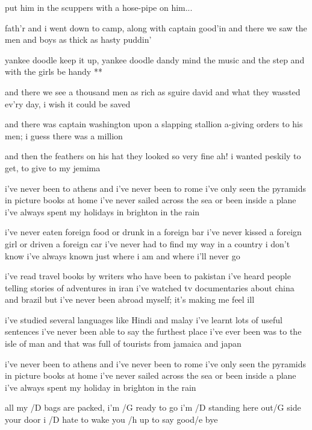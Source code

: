 put him in the scuppers with a hose-pipe on him...




fath'r and i went down to camp, along with captain good'in
and there we saw the men and boys as thick as hasty puddin'

\R  yankee doodle keep it up, yankee doodle dandy
    mind the music and the step and with the girls be handy **

and there we see a thousand men as rich as sguire david
and what they wassted ev'ry day, i wish it could be saved \s

and there was captain washington upon a slapping stallion
a-giving orders to his men; i guess there was a million \s

and then the feathers on his hat they looked so very fine
ah! i wanted peskily to get, to give to my jemima




i've never been to athens and i've never been to rome
i've only seen the pyramids in picture books at home
i've never sailed across the sea or been inside a plane
i've always spent my holidays in brighton in the rain \s

i've never eaten foreign food or drunk in a foreign bar
i've never  kissed a foreign girl or driven a foreign car
i've never had to find my way in a country i don't know
i've always known just where i am and where i'll never go \s

i've read travel books by writers who have been to pakistan
i've heard people telling stories of adventures in iran
i've watched tv documentaries about china and brazil
but i've never been abroad myself; it's making me feel ill \s

i've studied several languages like Hindi and malay
i've learnt lots of useful sentences i've never been able to say
the furthest place i've ever been was to the isle of  man
and that was full of tourists from jamaica and japan \s

i've never been to athens and i've never been to rome
i've only seen the pyramids in picture books at home
i've never sailed across the sea or been inside a plane
i've always spent my holiday in brighton in the rain




all my /D bags are packed, i'm /G ready to go
i'm /D standing here out/G side your door
i /D hate to wake you /h up to say good/e bye \s

